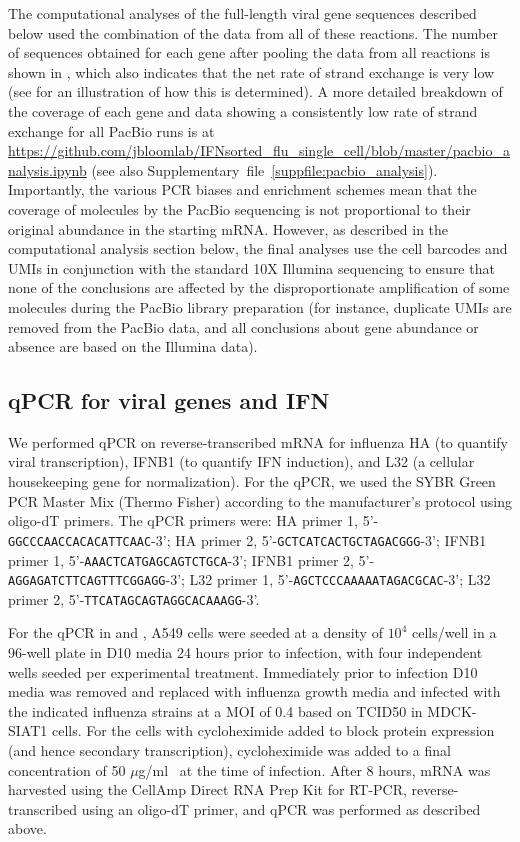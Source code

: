 \documentclass[9pt,lineno]{elife}
\begin{document}
The computational analyses of the full-length viral gene sequences described below used the combination of the data from all of these reactions.
The number of sequences obtained for each gene after pooling the data from all reactions is shown in , which also indicates that the net rate of strand exchange is very low (see  for an illustration of how this is determined).
A more detailed breakdown of the coverage of each gene and data showing a consistently low rate of strand exchange for all PacBio runs is at \url{https://github.com/jbloomlab/IFNsorted_flu_single_cell/blob/master/pacbio_analysis.ipynb} (see also Supplementary~file~\ref{suppfile:pacbio_analysis}).
Importantly, the various PCR biases and enrichment schemes mean that the coverage of molecules by the PacBio sequencing is not proportional to their original abundance in the starting mRNA.
However, as described in the computational analysis section below, the final analyses use the cell barcodes and UMIs in conjunction with the standard 10X Illumina sequencing to ensure that none of the conclusions are affected by the disproportionate amplification of some molecules during the PacBio library preparation (for instance, duplicate UMIs are removed from the PacBio data, and all conclusions about gene abundance or absence are based on the Illumina data).

\subsection{qPCR for viral genes and IFN}
We performed qPCR on reverse-transcribed mRNA for influenza HA (to quantify viral transcription), IFNB1 (to quantify IFN induction), and L32 (a cellular housekeeping gene for normalization).
For the qPCR, we used the SYBR Green PCR Master Mix (Thermo Fisher) according to the manufacturer's protocol using oligo-dT primers.
The qPCR primers were: HA primer 1, 5'-\texttt{GGCCCAACCACACATTCAAC}-3'; HA primer 2, 5'-\texttt{GCTCATCACTGCTAGACGGG}-3'; IFNB1 primer 1, 5'-\texttt{AAACTCATGAGCAGTCTGCA}-3'; IFNB1 primer 2, 5'-\texttt{AGGAGATCTTCAGTTTCGGAGG}-3'; L32 primer 1, 5'-\texttt{AGCTCCCAAAAATAGACGCAC}-3'; L32 primer 2, 5'-\texttt{TTCATAGCAGTAGGCACAAAGG}-3'. 

For the qPCR in  and , A549 cells were seeded at a density of $10^4$ cells/well in a 96-well plate in D10 media 24 hours prior to infection, with four independent wells seeded per experimental treatment. 
Immediately prior to infection D10 media was removed and replaced with influenza growth media and infected with the indicated influenza strains at a MOI of 0.4 based on TCID50 in MDCK-SIAT1 cells.
For the cells with cycloheximide added to block protein expression (and hence secondary transcription), cycloheximide was added to a final concentration of 50 $\mu$g/ml~\citep[a concentration sufficient to block secondary transcription;][]{killip2014activation} at the time of infection.
After 8 hours, mRNA was harvested using the CellAmp Direct RNA Prep Kit for RT-PCR, reverse-transcribed using an oligo-dT primer, and qPCR was performed as described above.
\end{document}
